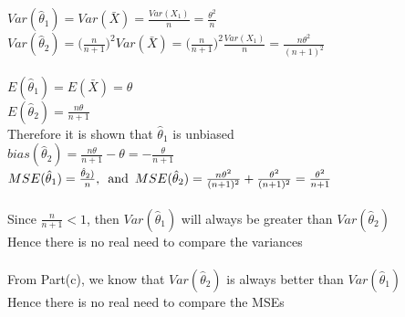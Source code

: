 \\

\\

$Var(\hat{\theta}_1) = Var(\bar{X}) = \frac{Var(X_1)}{n} = \frac{\theta ^2}{n}$\\

$Var(\hat{\theta}_2) = \Big( \frac{n}{n+1} \Big)^2 Var(\bar{X}) = \Big( \frac{n}{n+1} \Big)^2 \frac{Var(X_1)}{n} = \frac{n\theta^2}{(n+1)^2}$\\

\\

$E(\hat{\theta}_1) = E(\bar{X}) = \theta$\\

$E(\hat{\theta}_2) = \frac{n\theta}{n+1}$\\

Therefore it is shown that $\hat{\theta}_1$ is unbiased\\

$bias(\hat{\theta}_2) = \frac{n\theta}{n+1} - \theta = -\frac{\theta}{n+1}$\\

$MSE(\hat{\theta}_1) = \frac{\hat{\theta}_2)}{n}, \enskip \text{and} \enskip MSE(\hat{\theta}_2) = \frac{n\theta ^2}{(n+1)^2} + \frac{\theta ^2}{(n+1)^2} = \frac{\theta ^2}{n+1}$\\

\\

Since $ \frac{n}{n+1} < 1$, then $Var(\hat{\theta}_1)$ will always be greater than $Var(\hat{\theta}_2)$\\

Hence there is no real need to compare the variances\\

\\

From Part(c), we know that $Var(\hat{\theta}_2)$ is always better than $Var(\hat{\theta}_1)$\\

Hence there is no real need to compare the MSEs\\